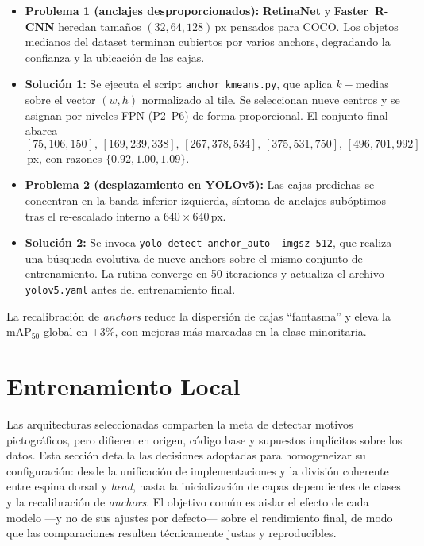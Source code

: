 \begin{itemize}
   \item \textbf{Problema 1 (anclajes desproporcionados):}
   \textbf{RetinaNet} y \textbf{Faster~R-CNN} heredan tamaños \((32, 64, 128)\)\,px pensados para COCO.
   Los objetos medianos del dataset terminan cubiertos por varios anchors, degradando la confianza y la ubicación de las cajas.
   \item \textbf{Solución 1:}
   Se ejecuta el script \texttt{anchor\_kmeans.py}, que aplica \(k\!\!-\!\)medias sobre el vector \((w,h)\) normalizado al tile.
   Se seleccionan nueve centros y se asignan por niveles FPN (P2–P6) de forma proporcional.
   El conjunto final abarca \([75,106,150],\,[169,239,338],\,[267,378,534],\,[375,531,750],\,[496,701,992]\)\,px, con razones \(\{0.92,1.00,1.09\}\).
   \item \textbf{Problema 2 (desplazamiento en YOLOv5):}
   Las cajas predichas se concentran en la banda inferior izquierda, síntoma de anclajes subóptimos tras el re-escalado interno a \(640\times640\)\,px.
   \item \textbf{Solución 2:}
   Se invoca \texttt{yolo detect anchor\_auto --imgsz 512}, que realiza una búsqueda evolutiva de nueve anchors sobre el mismo conjunto de entrenamiento.
   La rutina converge en 50 iteraciones y actualiza el archivo \texttt{yolov5.yaml} antes del entrenamiento final.
\end{itemize}

La recalibración de \emph{anchors} reduce la dispersión de cajas “fantasma” y eleva la \(\text{mAP}_{50}\) global en +3\%, con mejoras más marcadas en la clase minoritaria.

\section{Entrenamiento Local}\label{sec:entrenamiento_local}

Las arquitecturas seleccionadas comparten la meta de detectar motivos pictográficos, pero difieren en origen, código base y supuestos implícitos sobre los datos.
Esta sección detalla las decisiones adoptadas para homogeneizar su configuración: desde la unificación de implementaciones y la división coherente entre espina dorsal y \emph{head}, hasta la inicialización de capas dependientes de clases y la recalibración de \emph{anchors}.
El objetivo común es aislar el efecto de cada modelo —y no de sus ajustes por defecto— sobre el rendimiento final, de modo que las comparaciones resulten técnicamente justas y reproducibles.

